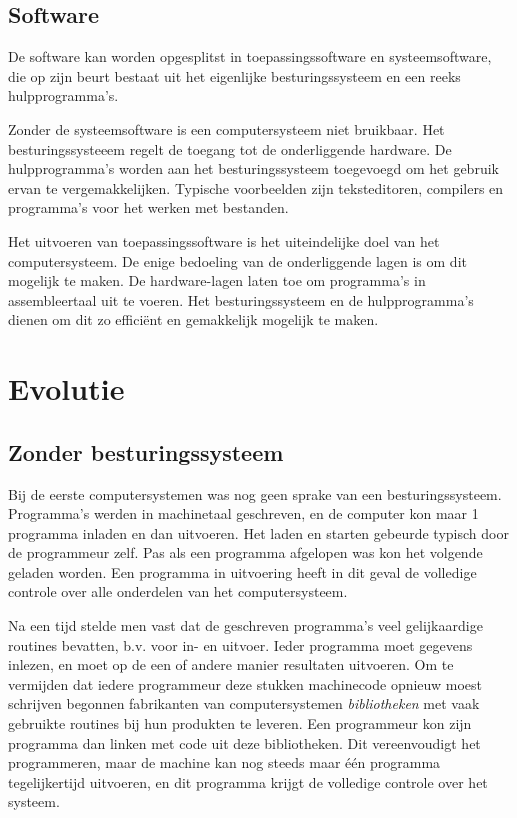 \subsection{Software}

De software kan worden opgesplitst in toepassingssoftware en
systeemsoftware, die op zijn beurt bestaat uit het eigenlijke
besturingssysteem en een reeks hulpprogramma's.

Zonder de systeemsoftware is een computersysteem niet bruikbaar.
Het besturingssysteeem regelt de toegang tot de onderliggende
hardware. De hulpprogramma's worden aan het besturingssysteem
toegevoegd om het gebruik ervan te vergemakkelijken. Typische
voorbeelden zijn teksteditoren, compilers en programma's voor het
werken met bestanden.

Het uitvoeren van toepassingssoftware is het uiteindelijke doel
van het computersysteem. De enige bedoeling van de onderliggende lagen
is om dit mogelijk te maken. De hardware-lagen laten toe om
programma's in assembleertaal uit te voeren. Het besturingssysteem en
de hulpprogramma's dienen om dit zo effici\"ent en gemakkelijk mogelijk
te maken.

\section{Evolutie}

\subsection{Zonder besturingssysteem}

Bij de eerste computersystemen was nog geen sprake van een
besturingssysteem. Programma's werden in machinetaal geschreven, en de
computer kon maar 1 programma inladen en dan uitvoeren. Het laden en
starten gebeurde typisch door de programmeur zelf. Pas als een
programma afgelopen was kon het volgende geladen worden. Een programma
in uitvoering heeft in dit geval de volledige controle over alle
onderdelen van het computersysteem.

Na een tijd stelde men vast dat de geschreven programma's veel
gelijkaardige routines bevatten, b.v. voor in- en uitvoer. Ieder
programma moet gegevens inlezen, en moet op de een of andere manier
resultaten uitvoeren. Om te vermijden dat iedere programmeur deze
stukken machinecode opnieuw moest schrijven begonnen fabrikanten van
computersystemen \emph{bibliotheken} met vaak
gebruikte routines bij hun produkten te leveren. Een programmeur kon
zijn programma dan linken met code uit deze bibliotheken. Dit
vereenvoudigt het programmeren, maar de machine kan nog steeds maar
\'e\'en programma tegelijkertijd uitvoeren, en dit programma krijgt de
volledige controle over het systeem.

